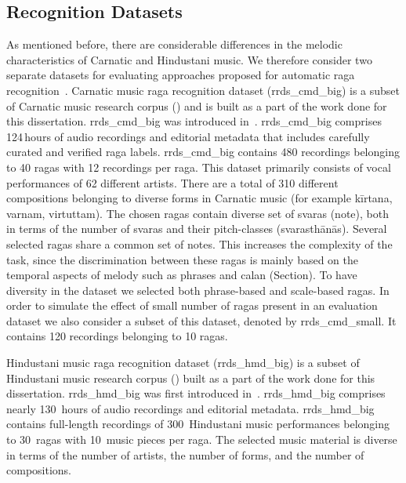 {{{{\subsection{ Recognition Datasets}
\label{sec:corpus_raga_recognition_datasets}

As mentioned before, there are considerable differences in the melodic characteristics of Carnatic and Hindustani music. We therefore consider two separate datasets for evaluating approaches proposed for automatic \gls{raga} recognition~. Carnatic music \gls{raga} recognition dataset (\acrshort{rrds_cmd_big}) is a subset of Carnatic music research corpus () and is built as a part of the work done for this dissertation. \acrshort{rrds_cmd_big} was introduced in~\cite{gulatiphrase_2016}. \acrshort{rrds_cmd_big} comprises 124\,hours of audio recordings and editorial metadata that includes carefully curated and verified \gls{raga} labels. \acrshort{rrds_cmd_big} contains 480 recordings belonging to 40 \glspl{raga} with 12 recordings per \gls{raga}. This dataset primarily consists of vocal performances of 62 different artists. There are a total of 310 different compositions belonging to diverse forms in Carnatic music (for example k\={i}rtana, varnam, virtuttam). The chosen \glspl{raga} contain diverse set of \glspl{svara} (note), both in terms of the number of \glspl{svara} and their pitch-classes (svarasth\={a}n\={a}s). Several selected \glspl{raga} share a common set of notes. This increases the complexity of the task, since the discrimination between these \glspl{raga} is mainly based on the temporal aspects of melody such as phrases and calan (Section). To have diversity in the dataset we selected both phrase-based and scale-based \glspl{raga}. In order to simulate the effect of small number of \glspl{raga} present in an evaluation dataset we also consider a subset of this dataset, denoted by \acrshort{rrds_cmd_small}. It contains 120 recordings belonging to 10 \glspl{raga}. 

Hindustani music \gls{raga} recognition dataset (\acrshort{rrds_hmd_big}) is a subset of Hindustani music research corpus () built as a part of the work done for this dissertation. \acrshort{rrds_hmd_big} was first introduced in~\cite{gulati_tdms_2016}. \acrshort{rrds_hmd_big} comprises nearly 130\, hours of audio recordings and editorial metadata. \acrshort{rrds_hmd_big} contains full-length recordings of 300~Hindustani music performances belonging to 30~\glspl{raga} with 10~music pieces per \gls{raga}. The selected music material is diverse in terms of the number of artists, the number of forms, and the number of compositions. 

}}}}
